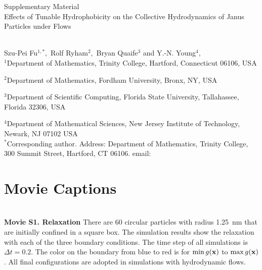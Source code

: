 
\thispagestyle{empty}

\newpage
{\Large \bf

  \noindent Supplementary Material\\

  \noindent 
 Effects of Tunable Hydrophobicity on the Collective Hydrodynamics of Janus Particles under Flows}\\

\noindent 
Szu-Pei Fu$^{1,*},$ 
Rolf Ryham$^{2},$ 
Bryan Quaife$^{3}$ and Y.-N. Young$^{4},$
\\

\noindent
$^{1}$Department of Mathematics, Trinity College, Hartford, Connecticut 06106, USA

\noindent
$^{2}$Department of Mathematics, Fordham University, Bronx, NY, USA

\noindent
$^{3}$Department of Scientific Computing, Florida State University, Tallahassee, Florida 32306, USA

\noindent
$^{4}$Department of Mathematical Sciences, New Jersey Institute of Technology, Newark, NJ 07102 USA
\\

\noindent $^*$Corresponding author. Address: Department of Mathematics, Trinity College, 
300 Summit Street, Hartford, CT 06106. email: 



\setcounter{page}{1}

\setcounter{figure}{0}
\renewcommand{\thefigure}{S\arabic{figure}}

\setcounter{equation}{0}
\renewcommand{\theequation}{S\arabic{equation}}

\setcounter{section}{0}
\renewcommand{\thesection}{S\arabic{section}} 





\sloppy
\section{Movie Captions}\mbox{} \\

\noindent
{\bf Movie S1. Relaxation} 
There are 60 circular particles with radius 1.25~nm that are initially
confined in a square box. The simulation results show the relaxation
with each of the three boundary conditions. The time step of all
simulations is $\Delta t=0.2$. The color on the boundary from blue to
red is for $\min g(\mathbf{x})$ to $\max g(\mathbf{x})$. All final configurations are
adopted in simulations with hydrodynamic flows. \\


